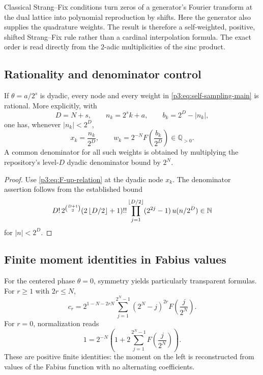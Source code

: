 \documentclass[11pt,oneside]{article}
\numberwithin{equation}{section}
\theoremstyle{definition}
\theoremstyle{remark}
\newcommand{\Q}{\mathbb Q}
\newcommand{\N}{\mathbb N}
\newcommand{\abs}[1]{\left|#1\right|}
\begin{document}
\begin{remark}
Classical Strang--Fix conditions turn zeros of a generator's Fourier transform at the dual lattice into polynomial reproduction by shifts.  Here the generator also supplies the quadrature weights.  The result is therefore a self-weighted, positive, shifted Strang--Fix rule rather than a cardinal interpolation formula.  The exact order is read directly from the $2$-adic multiplicities of the sinc product.
\end{remark}

\subsection{Rationality and denominator control}

\begin{corollary}
\label{p3:cor:rational-rules}
If $\theta=a/2^s$ is dyadic, every node and every weight in \eqref{p3:eq:self-sampling-main} is rational.  More explicitly, with
\[
 D=N+s,
 \qquad n_k=2^sk+a,
 \qquad b_k=2^D-\abs{n_k},
\]
one has, whenever $\abs{n_k}<2^D$,
\begin{equation}
 x_k=\frac{n_k}{2^D},
 \qquad
 w_k=2^{-N}F\!\left(\frac{b_k}{2^D}\right)\in\Q_{>0}.
 \label{p3:eq:rational-weights}
\end{equation}
A common denominator for all such weights is obtained by multiplying the repository's level-$D$ dyadic denominator bound by $2^N$.
\end{corollary}

\begin{proof}
Use \eqref{p3:eq:F-up-relation} at the dyadic node $x_k$.  The denominator assertion follows from the established bound
\[
 D!\,2^{\binom{D+1}{2}}(2\floor{D/2}+1)!!
 \prod_{j=1}^{\floor{D/2}}(2^{2j}-1)\,u(n/2^D)\in\N
\]
for $\abs n<2^D$.
\end{proof}

\subsection{Finite moment identities in Fabius values}

For the centered phase $\theta=0$, symmetry yields particularly transparent formulas.  For $r\ge1$ with $2r\le N$,
\begin{equation}
 \boxed{\displaystyle
 c_r=2^{1-N-2rN}
 \sum_{j=1}^{2^N-1}(2^N-j)^{2r}
 F\!\left(\frac j{2^N}\right).}
 \label{p3:eq:centered-moment-F}
\end{equation}
For $r=0$, normalization reads
\begin{equation}
 1=2^{-N}\left(1+2\sum_{j=1}^{2^N-1}F\!\left(\frac j{2^N}\right)\right).
 \label{p3:eq:centered-normalization-F}
\end{equation}
These are positive finite identities: the moment on the left is reconstructed from values of the Fabius function with no alternating coefficients.
\end{document}
